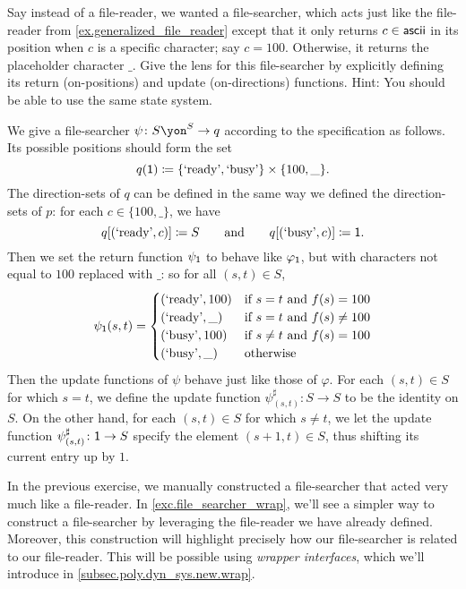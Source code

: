 \documentclass[Book-Poly]{subfiles}
\begin{document}
\begin{exercise} \label{exc.file_searcher}
Say instead of a file-reader, we wanted a file-searcher, which acts just like the file-reader from \cref{ex.generalized_file_reader} except that it only returns $c\in\mathsf{ascii}$ in its position when $c$ is a specific character; say $c=100$.
Otherwise, it returns the placeholder character $\_$.
Give the lens for this file-searcher by explicitly defining its return (on-positions) and update (on-directions) functions.
Hint: You should be able to use the same state system.
\begin{solution}
We give a file-searcher $\psi\colon S\yon^S\to q$ according to the specification as follows.
Its possible positions should form the set
\[
    q(\textsf{1})\coloneqq\{\text{`ready'}, \text{`busy'}\}\times\{100,\_\}.
\]
The direction-sets of $q$ can be defined in the same way we defined the direction-sets of $p$: for each $c\in\{100,\_\}$, we have
\[
    q[(\text{`ready'}, c)]\coloneqq S \qquad\text{and}\qquad q[(\text{`busy'}, c)]\coloneqq\textsf{1}.
\]
Then we set the return function $\psi_{\textsf{1}}$ to behave like $\varphi_{\textsf{1}}$, but with characters not equal to $100$ replaced with $\_$: so for all $(s,t)\in S$,
\begin{align*}
  \psi_{\textsf{1}}(s,t) =
  \begin{cases}
    (\text{`ready'}, 100) &\mbox{if $s=t$ and $f(s)=100$}\\
    (\text{`ready'}, \_) &\mbox{if $s=t$ and $f(s)\neq100$}\\
    (\text{`busy'}, 100) &\mbox{if $s\neq t$ and $f(s)=100$}\\
    (\text{`busy'}, \_) &\mbox{otherwise}\\
  \end{cases}
\end{align*}
Then the update functions of $\psi$ behave just like those of $\varphi$.
For each $(s,t)\in S$ for which $s=t$, we define the update function $\psi^\sharp_{(s,t)}\colon S\to S$ to be the identity on $S$.
On the other hand, for each $(s,t)\in S$ for which $s\neq t$, we let the update function $\psi^\sharp_{(s,t)}\colon \textsf{1}\to S$ specify the element $(s+1, t)\in S$, thus shifting its current entry up by $1$.
\end{solution}
\end{exercise}

In the previous exercise, we manually constructed a file-searcher that acted very much like a file-reader.
In \cref{exc.file_searcher_wrap}, we'll see a simpler way to construct a file-searcher by leveraging the file-reader we have already defined.
Moreover, this construction will highlight precisely how our file-searcher is related to our file-reader.
This will be possible using \emph{wrapper interfaces}, which we'll introduce in \cref{subsec.poly.dyn_sys.new.wrap}.
\end{document}
